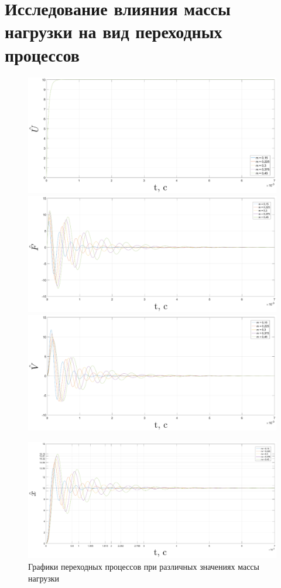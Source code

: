 \documentclass[fleqn, a4paper, 11pt, russian]{article}
\begin{document}
	\section{Исследование влияния массы нагрузки на вид переходных процессов}
	\begin{figure}[ht!]
		\centering
		\includegraphics[width = \textwidth]{mvar/mvarU}
		
		\includegraphics[width = \textwidth]{mvar/mvarF}

		\includegraphics[width = \textwidth]{mvar/mvarV}
	\end{figure}
	\begin{figure}[ht!]		
		\includegraphics[width = \textwidth]{mvar/mvarX}
		\caption{Графики переходных процессов при различных значениях массы нагрузки}
		\label{mvarGraph}
	\end{figure}
\end{document}
